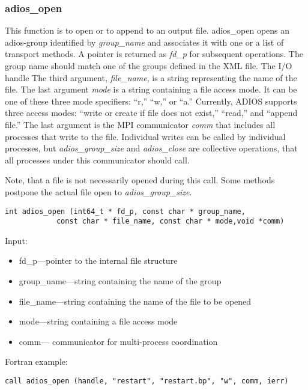 \subsubsection{adios\_open}

This function is to open or to append to an output file. adios\_open
opens an adios-group identified by \textit{group\_name}
and associates it with one or a list of transport methods. 
A pointer is returned as \textit{fd\_p} for subsequent operations. 
The group name should match one of the groups defined in the XML file. The I/O handle 
The third argument, \textit{file\_name}, is a string representing the name of 
the file. 
The last argument \textit{mode} is a string containing a file access mode. 
It can be one of these three mode specifiers: ``r,'' ``w,'' or ``a.'' Currently, 
ADIOS supports three access modes: ``write or create if file does not exist,'' 
``read,'' and ``append file.'' 
The last argument is the MPI communicator \textit{comm} that includes all
processes that write to the file. Individual writes can be called by individual processes, but \textit{adios\_group\_size} and \textit{adios\_close} are collective operations, that all processes under this communicator should call. 

Note, that a file is not necessarily opened during this call. Some methods postpone the actual file open to \textit{adios\_group\_size}.

\begin{lstlisting}[alsolanguage=C]
int adios_open (int64_t * fd_p, const char * group_name,
            const char * file_name, const char * mode,void *comm)
\end{lstlisting}

Input: 
\begin{itemize}
\item fd\_p---pointer to the internal file structure
\item group\_name---string containing the name of the group 
\item file\_name---string containing the name of the file to be opened 
\item mode---string containing  a file access mode
\item comm--- communicator for multi-process coordination
\end{itemize}

Fortran example: 
\begin{lstlisting}[alsolanguage=Fortran]
call adios_open (handle, "restart", "restart.bp", "w", comm, ierr)
\end{lstlisting}

